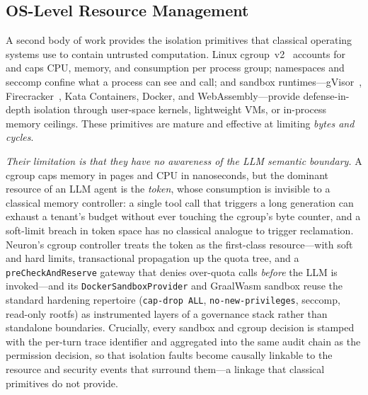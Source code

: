 \subsection{OS-Level Resource Management}
\label{sec:rw-osr}

A second body of work provides the isolation primitives that classical
operating systems use to contain untrusted computation. Linux
cgroup~v2~\cite{linux2024cgroupv2} accounts for and caps CPU, memory, and
\IO{} consumption per process group; namespaces and seccomp confine what a
process can see and call; and sandbox runtimes---gVisor~\cite{young2023gvisor},
Firecracker~\cite{agache2020firecracker}, Kata Containers, Docker, and
WebAssembly---provide defense-in-depth isolation through user-space kernels,
lightweight VMs, or in-process memory ceilings. These primitives are mature
and effective at limiting \emph{bytes and cycles}.

\emph{Their limitation is that they have no awareness of the LLM semantic
boundary.} A cgroup caps memory in pages and CPU in nanoseconds, but the
dominant resource of an LLM agent is the \emph{token}, whose consumption is
invisible to a classical memory controller: a single tool call that triggers
a long generation can exhaust a tenant's budget without ever touching the
cgroup's byte counter, and a soft-limit breach in token space has no
classical analogue to trigger reclamation. Neuron's cgroup controller
treats the token as the first-class resource---with soft and hard limits,
transactional propagation up the quota tree, and a
\texttt{preCheckAndReserve} gateway that denies over-quota calls
\emph{before} the LLM is invoked---and its \texttt{DockerSandboxProvider}
and GraalWasm sandbox reuse the standard hardening repertoire
(\texttt{cap-drop ALL}, \texttt{no-new-privileges}, seccomp, read-only
rootfs) as instrumented layers of a governance stack rather than standalone
boundaries. Crucially, every sandbox and cgroup decision is stamped with the
per-turn trace identifier and aggregated into the same audit chain as the
permission decision, so that isolation faults become causally linkable to
the resource and security events that surround them---a linkage that
classical primitives do not provide.

